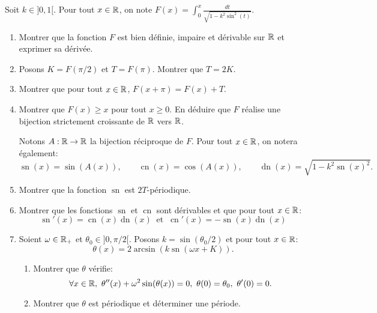 \newcommand{\sn}{\operatorname{sn}}
\newcommand{\cn}{\operatorname{cn}}
\newcommand{\dn}{\operatorname{dn}}

Soit $k\in ]0, 1[$. Pour tout $x\in \mathbb{R}$, on note $F(x) = \displaystyle{\int_{0}^{x}\frac{dt}{\sqrt{1-k^{2}\sin^{2}(t)}}}$.

\begin{enumerate}
 \item Montrer que la fonction $F$ est bien définie, impaire et dérivable sur $\mathbb{R}$ et exprimer sa dérivée.
 \item Posons $K = F(\pi / 2)$ et $T = F(\pi)$. Montrer que $T = 2K$.
 \item Montrer que pour tout $x\in \mathbb{R}$, $F(x + \pi) = F(x) + T$.
 \item Montrer que $F(x) \geq x$ pour tout $x\geq0$. En déduire que $F$ réalise une bijection strictement croissante de $\mathbb{R}$ vers $\mathbb{R}$.
 
Notons $A:\mathbb{R} \to \mathbb{R}$ la bijection réciproque de $F$. Pour tout $x\in \mathbb{R}$, on notera également:
\[ \sn (x) = \sin(A(x)),\qquad \cn (x) = \cos(A(x)),\qquad \dn (x) = \sqrt{1-k^{2}\sn(x)^{2}}.\] 


\item Montrer que la fonction $\sn$ est $2T$-périodique.

\item Montrer que les fonctions $\sn$ et $\cn$ sont dérivables et que pour tout $x\in \mathbb{R}$:
\[ \sn'(x) = \cn(x)\dn(x) \ \text{ et } \ \cn'(x) = -\sn(x) \dn(x)\]

\item Soient $\omega \in \mathbb{R}_{+}$ et $\theta_{0}\in ]0, \pi / 2[$. Posons $k = \sin(\theta_{0}/2)$ et pour tout $x\in \mathbb{R}$:
\[ \theta(x) = 2\arcsin(k\sn(\omega x + K)).\]
\begin{enumerate}
 \item Montrer que $\theta$ vérifie:
 \[ \forall x\in \mathbb{R},\ \theta''(x) + \omega^{2}\sin (\theta(x)) = 0,\ \theta(0) = \theta_{0},\ \theta'(0) = 0.\]
 \item Montrer que $\theta$ est périodique et déterminer une période.
\end{enumerate}
\end{enumerate}
